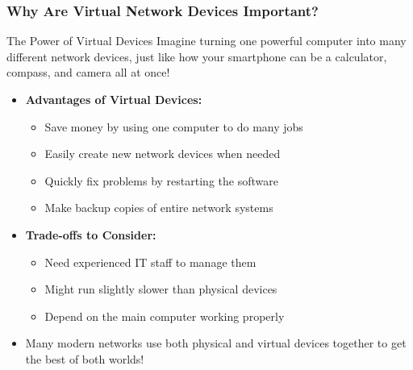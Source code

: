 \documentclass{beamer}
\begin{document}
\begin{frame}
    \frametitle{Why Are Virtual Network Devices Important?}
    
    \begin{block}{The Power of Virtual Devices}
        Imagine turning one powerful computer into many different network devices, just like how your smartphone can be a calculator, compass, and camera all at once!
    \end{block}
    
    \begin{itemize}
        \item \textbf{Advantages of Virtual Devices:}
        \begin{itemize}
            \item Save money by using one computer to do many jobs
            \item Easily create new network devices when needed
            \item Quickly fix problems by restarting the software
            \item Make backup copies of entire network systems
        \end{itemize}
        
        \item \textbf{Trade-offs to Consider:}
        \begin{itemize}
            \item Need experienced IT staff to manage them
            \item Might run slightly slower than physical devices
            \item Depend on the main computer working properly
        \end{itemize}
        
        \item Many modern networks use both physical and virtual devices together to get the best of both worlds!
    \end{itemize}
\end{frame}
\end{document}
